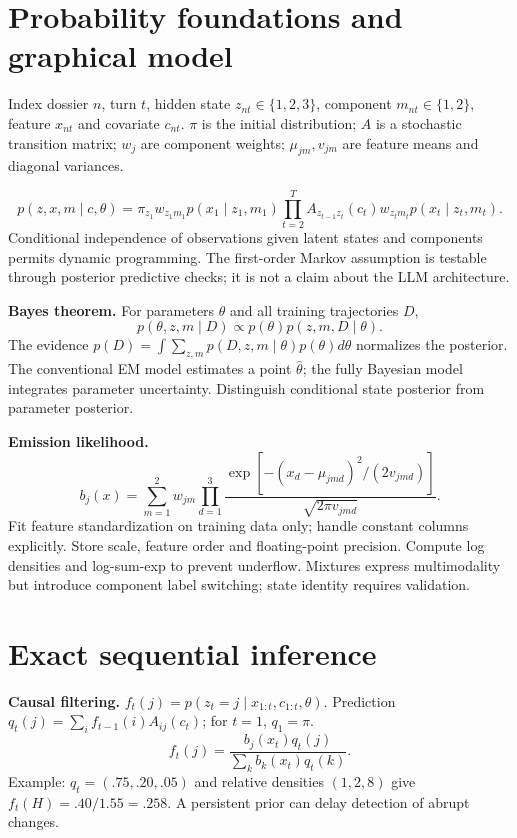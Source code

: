 \documentclass[11pt,letterpaper]{article}
\newcommand{\sectionpage}[1]{\clearpage\section{#1}}
\begin{document}
\sectionpage{Probability foundations and graphical model}
Index dossier $n$, turn $t$, hidden state $z_{nt}\in\{1,2,3\}$, component $m_{nt}\in\{1,2\}$, feature $x_{nt}$ and covariate $c_{nt}$. $\pi$ is the initial distribution; $A$ is a stochastic transition matrix; $w_j$ are component weights; $\mu_{jm},v_{jm}$ are feature means and diagonal variances.

\begin{center}
\end{center}
\[
p(z,x,m\mid c,\theta)=\pi_{z_1}w_{z_1m_1}p(x_1\mid z_1,m_1)
\prod_{t=2}^T A_{z_{t-1}z_t}(c_t)w_{z_tm_t}p(x_t\mid z_t,m_t).
\]
Conditional independence of observations given latent states and components permits dynamic programming. The first-order Markov assumption is testable through posterior predictive checks; it is not a claim about the LLM architecture.

\textbf{Bayes theorem.} For parameters $\theta$ and all training trajectories $D$,
\[
p(\theta,z,m\mid D)\propto p(\theta)p(z,m,D\mid\theta).
\]
The evidence $p(D)=\int\sum_{z,m}p(D,z,m\mid\theta)p(\theta)d\theta$ normalizes the posterior. The conventional EM model estimates a point $\hat\theta$; the fully Bayesian model integrates parameter uncertainty. Distinguish conditional state posterior from parameter posterior.

\textbf{Emission likelihood.}
\[
b_j(x)=\sum_{m=1}^2 w_{jm}\prod_{d=1}^3\frac{\exp[-(x_d-\mu_{jmd})^2/(2v_{jmd})]}{\sqrt{2\pi v_{jmd}}}.
\]
Fit feature standardization on training data only; handle constant columns explicitly. Store scale, feature order and floating-point precision. Compute log densities and log-sum-exp to prevent underflow. Mixtures express multimodality but introduce component label switching; state identity requires validation.

\sectionpage{Exact sequential inference}
\textbf{Causal filtering.} $f_t(j)=p(z_t=j\mid x_{1:t},c_{1:t},\theta)$.
Prediction $q_t(j)=\sum_i f_{t-1}(i)A_{ij}(c_t)$; for $t=1$, $q_1=\pi$.
\[
f_t(j)=\frac{b_j(x_t)q_t(j)}{\sum_k b_k(x_t)q_t(k)}.
\]
Example: $q_t=(.75,.20,.05)$ and relative densities $(1,2,8)$ give $f_t(H)=.40/1.55=.258$. A persistent prior can delay detection of abrupt changes.
\end{document}
